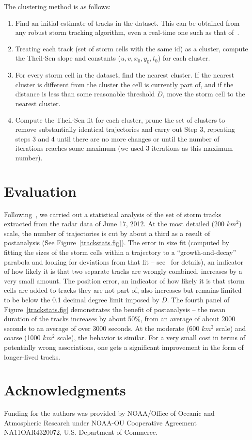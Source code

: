 \documentclass[11pt,twocolumn,twoside]{IEEEtran}
\begin{document}
The clustering method is as follows:
\begin{enumerate}
\item Find an initial estimate of tracks in the dataset. This can
be obtained from any robust storm tracking algorithm, even a real-time
one such as that of~\cite{scit,titan,stormattr}.
\item Treating each track (set of storm cells with the same id) as
a cluster, compute the Theil-Sen slope and constants ($u,v,x_0,y_0,t_0$)
for each cluster.
\item For every storm cell in the dataset, find the nearest cluster.
If the nearest cluster is different from the cluster the cell is
currently part of, and if the distance is less than some reasonable
threshold $D$, move the storm cell to the nearest cluster.
\item Compute the Theil-Sen fit for each cluster, prune the set of
clusters to remove substantially identical trajectories and carry out Step 3,
repeating steps 3 and 4
until there are no more changes or until the number of iterations
reaches some maximum (we used 3 iterations as this maximum number).
\end{enumerate}

\section{Evaluation}
Following~\cite{scoretrack}, we carried out a statistical analysis of
the set of storm tracks extracted from the radar data of June 17, 2012.
At the most detailed (200 $km^2$)
scale, the number of trajectories is cut by about
a third as a result of postanalysis (See Figure~\ref{trackstats.fig}).
The error in size fit (computed by
fitting the sizes of the storm cells within a trajectory to a
``growth-and-decay'' parabola
and looking for deviations from that fit -- see~\cite{scoretrack} for
details), an indicator
of how likely it is that two separate tracks are wrongly combined,
increases by a very small amount. The position error, an indicator
of how likely it is that storm cells are added to tracks they are not
part of, also increases but remains limited to be below the 0.1 decimal
degree limit imposed by $D$. The fourth panel of Figure~\ref{trackstats.fig}
demonstrates the benefit of postanalysis -- the mean duration of the
tracks increases by about 50\%, from an average of about 2000 seconds
to an average of over 3000 seconds. At the moderate (600 $km^2$ scale)
and coarse (1000 $km^2$ scale), the behavior is similar.
For a very small cost in terms of potentially wrong associations, one gets
a significant improvement in the form of longer-lived tracks.

\section*{Acknowledgments}
Funding for the authors was provided by NOAA/Office of Oceanic and Atmospheric Research under NOAA-OU Cooperative Agreement NA11OAR4320072, U.S. Department of Commerce.



\end{document}
